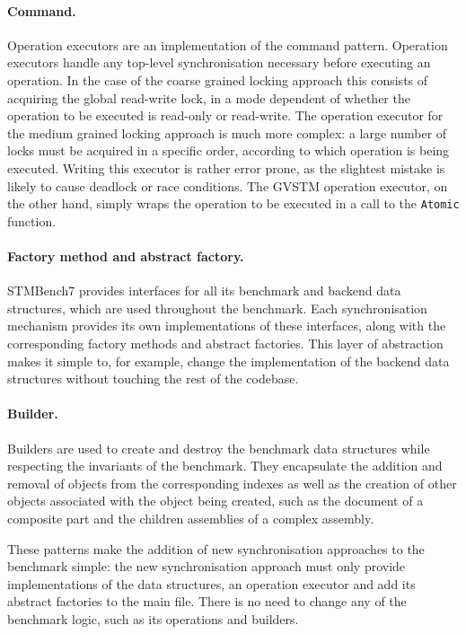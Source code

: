\documentclass[12pt,a4paper,oneside,openright]{report}
\newcommand{\goFunc}[1]{\texttt{#1}}
\begin{document}
\paragraph{Command.} Operation executors are an implementation of the
command pattern. Operation executors handle any top-level
synchronisation necessary before executing an operation. In the case
of the coarse grained locking approach this consists of acquiring the
global read-write lock, in a mode dependent of whether the operation
to be executed is read-only or read-write. The operation executor for
the medium grained locking approach is much more complex: a large
number of locks must be acquired in a specific order, according to
which operation is being executed. Writing this executor is rather
error prone, as the slightest mistake is likely to cause deadlock or
race conditions. The GVSTM operation executor, on the other hand,
simply wraps the operation to be executed in a call to the
\goFunc{Atomic} function.

\paragraph{Factory method and abstract factory.} STMBench7 provides
interfaces for all its benchmark and backend data structures, which are
used throughout the benchmark. Each synchronisation mechanism provides
its own implementations of these interfaces, along with the
corresponding factory methods and abstract factories. This layer of
abstraction makes it simple to, for example, change the implementation
of the backend data structures without touching the rest of the
codebase.

\paragraph{Builder.} Builders are used to create and destroy the
benchmark data structures while respecting the invariants of the
benchmark. They encapsulate the addition and removal of objects from
the corresponding indexes as well as the creation of other objects
associated with the object being created, such as the document of a
composite part and the children assemblies of a complex assembly.

\medskip

These patterns make the addition of new synchronisation approaches to
the benchmark simple: the new synchronisation approach must only
provide implementations of the data structures, an operation executor
and add its abstract factories to the main file. There is no need to
change any of the benchmark logic, such as its operations and
builders.
\end{document}
